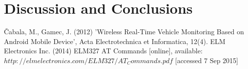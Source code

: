 \documentclass[12pt]{report}
\begin{document}
	\chapter{Discussion and Conclusions}
	
	\newpage	
	
	
	\begin{thebibliography}{9}
		 Čabala, M., Gamec, J. (2012) 'Wireless Real-Time Vehicle Monitoring Based on Android Mobile Device', Acta Electrotechnica et Informatica, 12(4).
		 ELM Electronics Inc. (2014) ELM327 AT Commands [online], available: 	$http://elmelectronics.com/ELM327/AT_Commands.pdf$ [accessed 7 Sep 2015]

	\end{thebibliography}	
	\newpage
\end{document}
